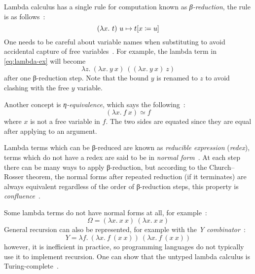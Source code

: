 Lambda calculus has a single rule for computation known as
\emph{β-reduction}, the rule is as follows~\cite{functional-Hudak,
  lambda-Hindley, tt-Nederpelt}:
\begin{equation}
  (\lambda x.\ t)\ u \mapsto t[x \coloneqq u]
  \label{eq:beta}
\end{equation}
One needs to be careful about variable names when substituting to avoid
accidental capture of free variables~\cite{functional-Hudak, lambda-Barendregt}.
For example, the lambda term in \cref{eq:lambda-ex} will become
\begin{equation}
  \lambda z.\ (\lambda x.\ y\ x)\ ((\lambda x.\ y\ x)\ z)
  \label{eq:lambda-ex-beta}
\end{equation}
after one β-reduction step. Note that the bound \(y\) is renamed to \(z\) to
avoid clashing with the free \(y\) variable.

Another concept is \emph{η-equivalence}, which says the
following~\cite{functional-Hudak, lambda-Barendregt}:
\begin{equation}
  (\lambda x.\ f\ x) \simeq f
\end{equation}
where \(x\) is not a free variable in \(f\). The two sides are equated since
they are equal after applying to an argument.

Lambda terms which can be β-reduced are known as \emph{reducible expression}
(\emph{redex}), terms which do not have a redex are said to be in \emph{normal
  form}~\cite{functional-Barendregt, lambda-Hindley, tt-Nederpelt}. At each step
there can be many ways to apply β-reduction, but according to the
Church{--}Rosser theorem, the normal forms after repeated reduction (if it
terminates) are always equivalent regardless of the order of β-reduction steps,
this property is \emph{confluence}~\cite{lambda-Hindley, churchrosser,
  tt-Nederpelt}.

Some lambda terms do not have normal forms at all, for
example~\cite{functional-Hudak, lambda-Hindley, type-Pierce}:
\begin{equation}
  \Omega = (\lambda x.\ x\ x)\ (\lambda x.\ x\ x)
  \label{eq:omega}
\end{equation}
General recursion can also be represented, for example with the \emph{Y
  combinator}~\cite{functional-Hudak, lambda-Hindley, tt-Nederpelt}:
\begin{equation}
  Y = \lambda f.\ (\lambda x.\ f\ (x\ x))\ (\lambda x.\ f\ (x\ x))
  \label{eq:ycomb}
\end{equation}
however, it is inefficient in practice, so programming languages do not
typically use it to implement recursion. One can show that the untyped lambda
calculus is Turing-complete~\cite{lambda-Turing, type-Pierce}.

